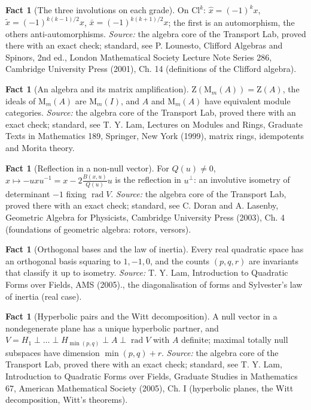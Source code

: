 \documentclass[11pt]{article}
\theoremstyle{definition}
\newtheorem{fact}[theorem]{Fact}
\theoremstyle{plain}
\providecommand{\Cl}{}\renewcommand{\Cl}{\mathrm{Cl}}
\providecommand{\Mat}{}\renewcommand{\Mat}{\mathrm{M}}
\providecommand{\Zc}{}\renewcommand{\Zc}{\mathrm{Z}}
\begin{document}
\begin{fact}[The three involutions on each grade]\label{c:std-algebra.involution-properties}
On $\Cl^{k}$: $\hat{x} = (-1)^{k}x$, $\tilde{x} = (-1)^{k(k-1)/2}x$, $\bar{x} = (-1)^{k(k+1)/2}x$; the first is an automorphism, the others anti-automorphisms.
\emph{Source:} the algebra core of the Transport Lab, proved there with an exact check; standard, see P. Lounesto, Clifford Algebras and Spinors, 2nd ed., London Mathematical Society Lecture Note Series 286, Cambridge University Press (2001), Ch. 14 (definitions of the Clifford algebra).
\end{fact}

\begin{fact}[An algebra and its matrix amplification]\label{c:std-algebra.morita-amplification}
$\Zc(\Mat_m(A)) = \Zc(A)$, the ideals of $\Mat_m(A)$ are $\Mat_m(I)$, and $A$ and $\Mat_m(A)$ have equivalent module categories.
\emph{Source:} the algebra core of the Transport Lab, proved there with an exact check; standard, see T. Y. Lam, Lectures on Modules and Rings, Graduate Texts in Mathematics 189, Springer, New York (1999), matrix rings, idempotents and Morita theory.
\end{fact}

\begin{fact}[Reflection in a non-null vector]\label{c:std-algebra.reflection}
For $Q(u) \ne 0$, $x \mapsto -uxu^{-1} = x - 2\frac{B(x,u)}{Q(u)}u$ is the reflection in $u^{\perp}$: an involutive isometry of determinant $-1$ fixing $\operatorname{rad} V$.
\emph{Source:} the algebra core of the Transport Lab, proved there with an exact check; standard, see C. Doran and A. Lasenby, Geometric Algebra for Physicists, Cambridge University Press (2003), Ch. 4 (foundations of geometric algebra: rotors, versors).
\end{fact}

\begin{fact}[Orthogonal bases and the law of inertia]\label{c:std-algebra.sylvester-inertia}
Every real quadratic space has an orthogonal basis squaring to $1, -1, 0$, and the counts $(p, q, r)$ are invariants that classify it up to isometry.
\emph{Source:} T. Y. Lam, Introduction to Quadratic Forms over Fields, AMS (2005)., the diagonalisation of forms and Sylvester's law of inertia (real case).
\end{fact}

\begin{fact}[Hyperbolic pairs and the Witt decomposition]\label{c:std-algebra.witt-decomposition}
A null vector in a nondegenerate plane has a unique hyperbolic partner, and $V = H_1 \perp \dots \perp H_{\min(p,q)} \perp A \perp \operatorname{rad} V$ with $A$ definite; maximal totally null subspaces have dimension $\min(p,q) + r$.
\emph{Source:} the algebra core of the Transport Lab, proved there with an exact check; standard, see T. Y. Lam, Introduction to Quadratic Forms over Fields, Graduate Studies in Mathematics 67, American Mathematical Society (2005), Ch. I (hyperbolic planes, the Witt decomposition, Witt's theorems).
\end{fact}
\end{document}

